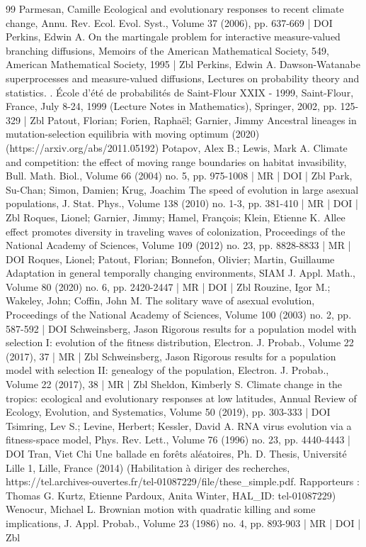 \begin{thebibliography}{99}
Parmesan, Camille Ecological and evolutionary responses to recent climate change, Annu. Rev. Ecol. Evol. Syst., Volume 37 (2006), pp. 637-669 | DOI
Perkins, Edwin A. On the martingale problem for interactive measure-valued branching diffusions, Memoirs of the American Mathematical Society, 549, American Mathematical Society, 1995 | Zbl
Perkins, Edwin A. Dawson-Watanabe superprocesses and measure-valued diffusions, Lectures on probability theory and statistics. . École d’été de probabilités de Saint-Flour XXIX - 1999, Saint-Flour, France, July 8-24, 1999 (Lecture Notes in Mathematics), Springer, 2002, pp. 125-329 | Zbl
Patout, Florian; Forien, Raphaël; Garnier, Jimmy Ancestral lineages in mutation-selection equilibria with moving optimum (2020) (https://arxiv.org/abs/2011.05192)
Potapov, Alex B.; Lewis, Mark A. Climate and competition: the effect of moving range boundaries on habitat invasibility, Bull. Math. Biol., Volume 66 (2004) no. 5, pp. 975-1008 | MR | DOI | Zbl
Park, Su-Chan; Simon, Damien; Krug, Joachim The speed of evolution in large asexual populations, J. Stat. Phys., Volume 138 (2010) no. 1-3, pp. 381-410 | MR | DOI | Zbl
Roques, Lionel; Garnier, Jimmy; Hamel, François; Klein, Etienne K. Allee effect promotes diversity in traveling waves of colonization, Proceedings of the National Academy of Sciences, Volume 109 (2012) no. 23, pp. 8828-8833 | MR | DOI
Roques, Lionel; Patout, Florian; Bonnefon, Olivier; Martin, Guillaume Adaptation in general temporally changing environments, SIAM J. Appl. Math., Volume 80 (2020) no. 6, pp. 2420-2447 | MR | DOI | Zbl
Rouzine, Igor M.; Wakeley, John; Coffin, John M. The solitary wave of asexual evolution, Proceedings of the National Academy of Sciences, Volume 100 (2003) no. 2, pp. 587-592 | DOI
Schweinsberg, Jason Rigorous results for a population model with selection I: evolution of the fitness distribution, Electron. J. Probab., Volume 22 (2017), 37 | MR | Zbl
Schweinsberg, Jason Rigorous results for a population model with selection II: genealogy of the population, Electron. J. Probab., Volume 22 (2017), 38 | MR | Zbl
Sheldon, Kimberly S. Climate change in the tropics: ecological and evolutionary responses at low latitudes, Annual Review of Ecology, Evolution, and Systematics, Volume 50 (2019), pp. 303-333 | DOI
Tsimring, Lev S.; Levine, Herbert; Kessler, David A. RNA virus evolution via a fitness-space model, Phys. Rev. Lett., Volume 76 (1996) no. 23, pp. 4440-4443 | DOI
Tran, Viet Chi Une ballade en forêts aléatoires, Ph. D. Thesis, Université Lille 1, Lille, France (2014) (Habilitation à diriger des recherches, https://tel.archives-ouvertes.fr/tel-01087229/file/these\_simple.pdf. Rapporteurs : Thomas G. Kurtz, Etienne Pardoux, Anita Winter, HAL\_ID: tel-01087229)
Wenocur, Michael L. Brownian motion with quadratic killing and some implications, J. Appl. Probab., Volume 23 (1986) no. 4, pp. 893-903 | MR | DOI | Zbl
\end{thebibliography}
